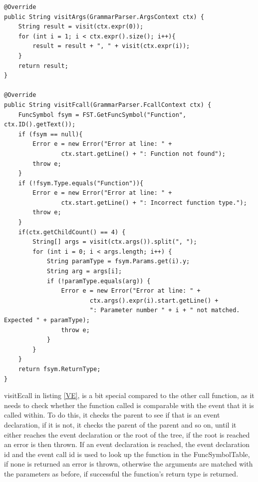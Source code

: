 \begin{lstlisting}[caption={SymbolTypeVisitor - visitArgs and visitFcall functions}, label={VAF}]
@Override
public String visitArgs(GrammarParser.ArgsContext ctx) {
    String result = visit(ctx.expr(0));
    for (int i = 1; i < ctx.expr().size(); i++){
        result = result + ", " + visit(ctx.expr(i));
    }
    return result;
}

@Override
public String visitFcall(GrammarParser.FcallContext ctx) {
    FuncSymbol fsym = FST.GetFuncSymbol("Function", ctx.ID().getText());
    if (fsym == null){
        Error e = new Error("Error at line: " +
                ctx.start.getLine() + ": Function not found");
        throw e;
    }
    if (!fsym.Type.equals("Function")){
        Error e = new Error("Error at line: " +
                ctx.start.getLine() + ": Incorrect function type.");
        throw e;
    }
    if(ctx.getChildCount() == 4) {
        String[] args = visit(ctx.args()).split(", ");
        for (int i = 0; i < args.length; i++) {
            String paramType = fsym.Params.get(i).y;
            String arg = args[i];
            if (!paramType.equals(arg)) {
                Error e = new Error("Error at line: " +
                        ctx.args().expr(i).start.getLine() +
                        ": Parameter number " + i + " not matched. Expected " + paramType);
                throw e;
            }
        }
    }
    return fsym.ReturnType;
}
\end{lstlisting}

visitEcall in listing \ref{VE}, is a bit special compared to the other call function, as it needs to check whether the function called is comparable with the event that it is called within. To do this, it checks the parent to see if that is an event declaration, if it is not, it checks the parent of the parent and so on, until it either reaches the event declaration or the root of the tree, if the root is reached an error is then thrown. If an event declaration is reached, the event declaration id and the event call id is used to look up the function in the FuncSymbolTable, if none is returned an error is thrown, otherwise the arguments are matched with the parameters as before, if successful the function's return type is returned. 

